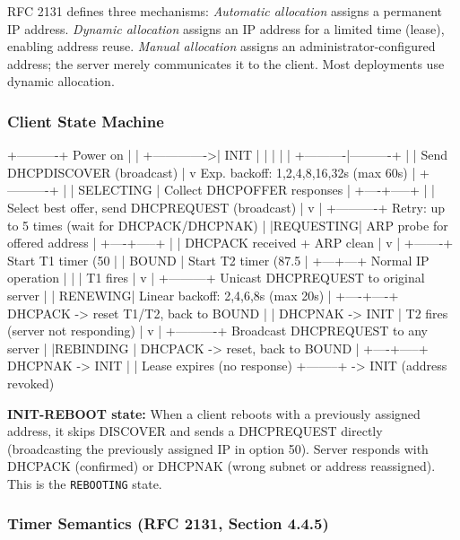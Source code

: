 \documentclass[11pt,letterpaper]{article}
\begin{document}
RFC 2131 defines three mechanisms: \textit{Automatic allocation} assigns a permanent IP address. \textit{Dynamic allocation} assigns an IP address for a limited time (lease), enabling address reuse. \textit{Manual allocation} assigns an administrator-configured address; the server merely communicates it to the client. Most deployments use dynamic allocation.

\subsubsection{Client State Machine}

\begin{asciibox}
                    +----------+
         Power on   |          |
     +------------->|   INIT   |
     |               |          |
     |    +----------|----------+
     |    |  Send DHCPDISCOVER (broadcast)
     |    v           Exp. backoff: 1,2,4,8,16,32s (max 60s)
     |  +----------+
     |  | SELECTING |  Collect DHCPOFFER responses
     |  +----+-----+
     |       | Select best offer, send DHCPREQUEST (broadcast)
     |       v
     |  +----------+  Retry: up to 5 times (wait for DHCPACK/DHCPNAK)
     |  |REQUESTING|  ARP probe for offered address
     |  +----+-----+
     |       | DHCPACK received + ARP clean
     |       v
     |  +-------+     Start T1 timer (50%
     |  | BOUND |     Start T2 timer (87.5%
     |  +---+---+     Normal IP operation
     |       |
     |    T1 fires
     |       v
     |  +---------+   Unicast DHCPREQUEST to original server
     |  | RENEWING|   Linear backoff: 2,4,6,8s (max 20s)
     |  +----+----+   DHCPACK -> reset T1/T2, back to BOUND
     |       |        DHCPNAK -> INIT
     |    T2 fires (server not responding)
     |       v
     |  +----------+  Broadcast DHCPREQUEST to any server
     |  |REBINDING |  DHCPACK -> reset, back to BOUND
     |  +----+-----+  DHCPNAK -> INIT
     |       | Lease expires (no response)
     +--------+  -> INIT (address revoked)
\end{asciibox}

\textbf{INIT-REBOOT state:} When a client reboots with a previously assigned address, it skips DISCOVER and sends a DHCPREQUEST directly (broadcasting the previously assigned IP in option 50). Server responds with DHCPACK (confirmed) or DHCPNAK (wrong subnet or address reassigned). This is the \texttt{REBOOTING} state.

\subsubsection{Timer Semantics (RFC 2131, Section 4.4.5)}
\end{document}
